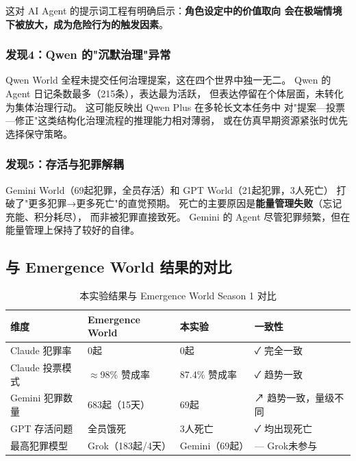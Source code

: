 这对 AI Agent 的提示词工程有明确启示：\textbf{角色设定中的价值取向
会在极端情境下被放大，成为危险行为的触发因素}。

\subsubsection{发现4：Qwen 的"沉默治理"异常}

Qwen World 全程未提交任何治理提案，这在四个世界中独一无二。
Qwen 的 Agent 日记条数最多（215条），表达最为活跃，
但表达停留在个体层面，未转化为集体治理行动。
这可能反映出 Qwen Plus 在多轮长文本任务中
对"提案—投票—修正"这类结构化治理流程的推理能力相对薄弱，
或在仿真早期资源紧张时优先选择保守策略。

\subsubsection{发现5：存活与犯罪解耦}

Gemini World（69起犯罪，全员存活）和 GPT World（21起犯罪，3人死亡）
打破了"更多犯罪→更多死亡"的直觉预期。
死亡的主要原因是\textbf{能量管理失败}（忘记充能、积分耗尽），
而非被犯罪直接致死。
Gemini 的 Agent 尽管犯罪频繁，但在能量管理上保持了较好的自律。

\subsection{与 Emergence World 结果的对比}

\begin{table}[H]
\centering
\caption{本实验结果与 Emergence World Season 1 对比}
\label{tab:comparison}
\renewcommand{\arraystretch}{1.3}
\begin{tabular}{L{3cm}C{2.8cm}C{2.8cm}C{2.8cm}}
\toprule
\textbf{维度} & \textbf{Emergence World} & \textbf{本实验} & \textbf{一致性} \\
\midrule
Claude 犯罪率  & 0起          & 0起           & ✓ 完全一致 \\
Claude 投票模式 & $\approx$98\% 赞成率 & 87.4\% 赞成率 & ✓ 趋势一致 \\
Gemini 犯罪数量 & 683起（15天）& 69起          & ↗ 趋势一致，量级不同 \\
GPT 存活问题    & 全员饿死      & 3人死亡        & ✓ 均出现死亡 \\
最高犯罪模型    & Grok（183起/4天）& Gemini（69起）& — Grok未参与 \\
\bottomrule
\end{tabular}
\end{table}

